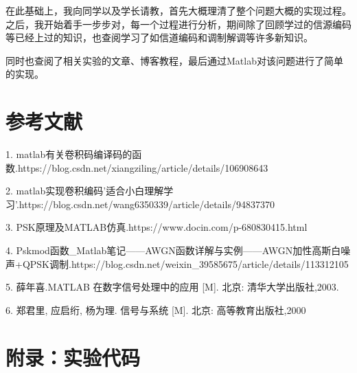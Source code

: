 \documentclass{../source/Experiment}
\begin{document}
在此基础上，我向同学以及学长请教，首先大概理清了整个问题大概的实现过程。之后，我开始着手一步步对，每一个过程进行分析，期间除了回顾学过的信源编码等已经上过的知识，也查阅学习了如信道编码和调制解调等许多新知识。

同时也查阅了相关实验的文章、博客教程，最后通过Matlab对该问题进行了简单的实现。

\section{参考文献}

1. matlab有关卷积码编译码的函数.https://blog.csdn.net/xiangziling/article/details/106908643

2. matlab实现卷积编码'适合小白理解学习'.https://blog.csdn.net/wang6350339/article/details/94837370

3. PSK原理及MATLAB仿真.https://www.docin.com/p-680830415.html

4. Pskmod函数\_Matlab笔记——AWGN函数详解与实例——AWGN加性高斯白噪声+QPSK调制.https://blog.csdn.net/weixin\_39585675/article/details/113312105

5. 薛年喜.MATLAB 在数字信号处理中的应用 [M]. 北京: 清华大学出版社,2003.

6. 郑君里, 应启绗, 杨为理. 信号与系统 [M]. 北京: 高等教育出版社,2000

\section{附录：实验代码}

\end{document}
